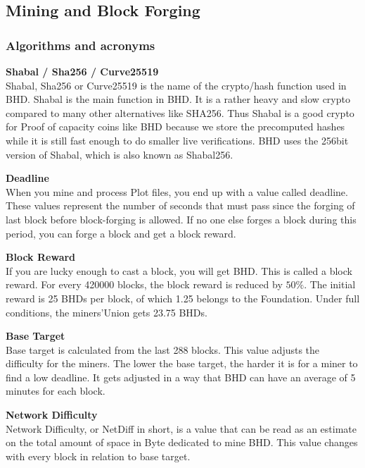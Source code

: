 \subsection{Mining and Block Forging}
\subsubsection{Algorithms and acronyms}
\begin{flushleft}
    \textbf{Shabal / Sha256 / Curve25519}\\
    Shabal, Sha256 or Curve25519 is the name of the crypto/hash function used in BHD. Shabal is the main function in BHD. It is a rather heavy and slow crypto compared to many other alternatives like SHA256. Thus Shabal is a good crypto for Proof of capacity coins like BHD because we store the precomputed hashes while it is still fast enough to do smaller live verifications. BHD uses the 256bit version of Shabal, which is also known as Shabal256.
\end{flushleft}
\begin{flushleft}
    \textbf{Deadline}\\
    When you mine and process Plot files, you end up with a value called deadline. These values represent the number of seconds that must pass since the forging of last block before block-forging is allowed. If no one else forges a block during this period, you can forge a block and get a block reward.
\end{flushleft}
\begin{flushleft}
    \textbf{Block Reward}\\
    If you are lucky enough to cast a block, you will get BHD. This is called a block reward. For every 420000 blocks, the block reward is reduced by $50\%$. The initial reward is 25 BHDs per block, of which 1.25 belongs to the Foundation. Under full conditions, the miners'Union gets 23.75 BHDs.
\end{flushleft}
\begin{flushleft}
    \textbf{Base Target}\\
    Base target is calculated from the last 288 blocks. This value adjusts the difficulty for the miners. The lower the base target, the harder it is for a miner to find a low deadline. It gets adjusted in a way that BHD can have an average of 5 minutes for each block.
\end{flushleft}
\begin{flushleft}
    \textbf{Network Difficulty}\\
    Network Difficulty, or NetDiff in short, is a value that can be read as an estimate on the total amount of space in Byte dedicated to mine BHD. This value changes with every block in relation to base target.
\end{flushleft}
